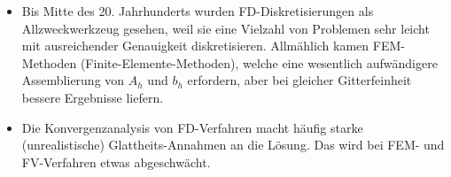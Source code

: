 \begin{note}
	\begin{itemize}
		\item
			Bis Mitte des 20. Jahrhunderts wurden FD-Diskretisierungen als Allzweckwerkzeug gesehen, weil sie eine Vielzahl von Problemen sehr leicht mit ausreichender Genauigkeit diskretisieren.
			Allmählich kamen FEM-Methoden (Finite-Elemente-Methoden), welche eine wesentlich aufwändigere Assemblierung von $A_h$ und $b_h$ erfordern, aber bei gleicher Gitterfeinheit bessere Ergebnisse liefern.
		\item
			Die Konvergenzanalysis von FD-Verfahren macht häufig starke (unrealistische) Glattheits-Annahmen an die Lösung.
			Das wird bei FEM- und FV-Verfahren etwas abgeschwächt.
	\end{itemize}
\end{note}
